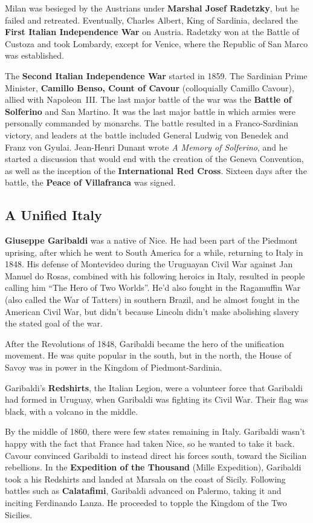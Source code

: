 Milan was besieged by the Austrians under \textbf{Marshal Josef Radetzky}, but he failed and retreated.
Eventually, Charles Albert, King of Sardinia,
declared the \textbf{First Italian Independence War} on Austria.
Radetzky won at the Battle of Custoza and took Lombardy,
except for Venice, where the Republic of San Marco was established.

The \textbf{Second Italian Independence War} started in 1859.
The Sardinian Prime Minister, \textbf{Camillo Benso, Count of Cavour} (colloquially Camillo Cavour),
allied with Napoleon~III\@.
The last major battle of the war was the \textbf{Battle of Solferino} and San Martino.
It was the last major battle in which armies were personally commanded by monarchs.
The battle resulted in a Franco-Sardinian victory,
and leaders at the battle included General Ludwig von Benedek and Franz von Gyulai.
Jean-Henri Dunant wrote \textit{A Memory of Solferino},
and he started a discussion that would end with the creation of the Geneva Convention,
as well as the inception of the \textbf{International Red Cross}.
Sixteen days after the battle, the \textbf{Peace of Villafranca} was signed.

\subsection*{A Unified Italy}

\textbf{Giuseppe Garibaldi} was a native of Nice.
He had been part of the Piedmont uprising, after which he went to South America for a while,
returning to Italy in 1848.
His defense of Montevideo during the Uruguayan Civil War against Jan Manuel do Rosas,
combined with his following heroics in Italy,
resulted in people calling him ``The Hero of Two Worlds''.
He'd also fought in the Ragamuffin War (also called the War of Tatters) in southern Brazil,
and he almost fought in the American Civil War,
but didn't because Lincoln didn't make abolishing slavery the stated goal of the war.

After the Revolutions of 1848, Garibaldi became the hero of the unification movement.
He was quite popular in the south, but in the north,
the House of Savoy was in power in the Kingdom of Piedmont-Sardinia.

Garibaldi's \textbf{Redshirts}, the Italian Legion,
were a volunteer force that Garibaldi had formed in Uruguay,
when Garibaldi was fighting its Civil War.
Their flag was black, with a volcano in the middle.

By the middle of 1860, there were few states remaining in Italy.
Garibaldi wasn't happy with the fact that France had taken Nice, so he wanted to take it back.
Cavour convinced Garibaldi to instead direct his forces south, toward the Sicilian rebellions.
In the \textbf{Expedition of the Thousand} (Mille Expedition),
Garibaldi took a his Redshirts and landed at Marsala on the coast of Sicily.
Following battles such as \textbf{Calatafimi},
Garibaldi advanced on Palermo, taking it and inciting Ferdinando Lanza.
He proceeded to topple the Kingdom of the Two Sicilies.

